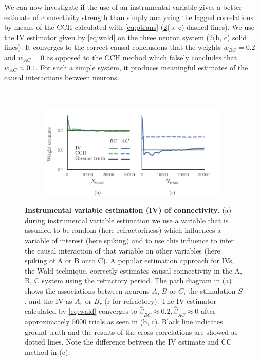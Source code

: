 \documentclass[11pt]{article}
\begin{document}
We can now investigate if the use of an instrumental variable gives a better estimate of connectivity strength than simply analyzing the lagged correlations by means of the CCH calculated with \cref{eq:ptrans} (\cref{fig:cch_iv_triple}(b, c) dashed lines). 
We use the IV estimator given by \cref{eq:wald} on the three neuron system (\cref{fig:cch_iv_triple}(b, c) solid lines). 
It converges to the correct causal conclusions that the weights $ w_{BC} = 0.2 $ and $ w_{AC} = 0 $ as opposed to the CCH method which falsely concludes that $ w_{AC} \approx 0.1 $. 
For such a simple system, it produces meaningful estimates of the causal interactions between neurons.
\begin{figure}
\makeatletter
\renewcommand\p@subfigure{}
\makeatother
\begin{subfigure}{\textwidth} \centering
{}
\caption{} \label{fig:cch_iv_triple:0}
\end{subfigure}\medskip\\
\begin{subfigure}{\textwidth} 
\includegraphics[scale=1]{triple}
\end{subfigure}
\caption{{\bf Instrumental variable estimation (IV) of connectivity}. 
(a) during instrumental variable estimation we use a variable that is assumed to be random (here refractoriness) which influences a variable of interest (here spiking) and to use this influence to infer the causal interaction of that variable on other variables (here spiking of A or B onto C). 
A popular estimation approach for IVs, the Wald technique, correctly estimates causal connectivity in the A, B, C system using the refractory period. 
The path diagram in (a) shows the associations between neurons $ A $, $ B $ or $ C $, the stimulation $ S $, and the IV as $ A_{r} $ or $ B_{r} $ (r for refractory).
The IV estimator calculated by \cref{eq:wald} converges to $ \hat{\beta}_{BC} \approx 0.2, \hat{\beta}_{AC} \approx 0 $ after approximately $ 5000 $ trials as seen in (b, c). 
Black line indicates ground truth and the results of the cross-correlations are showed as dotted lines. 
Note the difference between the IV estimate and CC method in (c).}
\label{fig:cch_iv_triple}
\end{figure}
\end{document}
